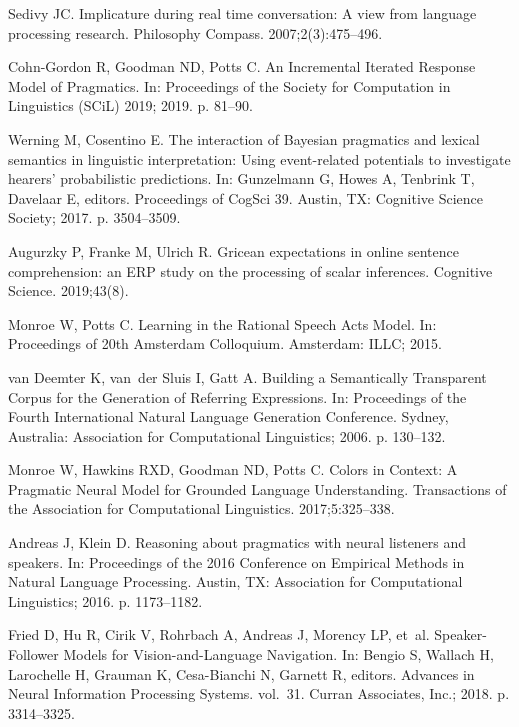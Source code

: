 \documentclass[10pt,letterpaper]{article}
\begin{document}
\begin{thebibliography}{10}
Sedivy JC.
\newblock Implicature during real time conversation: A view from language
  processing research.
\newblock Philosophy Compass. 2007;2(3):475--496.

Cohn-Gordon R, Goodman ND, Potts C.
\newblock An Incremental Iterated Response Model of Pragmatics.
\newblock In: Proceedings of the {S}ociety for {C}omputation in {L}inguistics
  ({SCiL}) 2019; 2019. p. 81--90.

Werning M, Cosentino E.
\newblock The interaction of {B}ayesian pragmatics and lexical semantics in
  linguistic interpretation: {U}sing event-related potentials to investigate
  hearers' probabilistic predictions.
\newblock In: Gunzelmann G, Howes A, Tenbrink T, Davelaar E, editors.
  Proceedings of {CogSci} 39. Austin, TX: Cognitive Science Society; 2017. p.
  3504--3509.

Augurzky P, Franke M, Ulrich R.
\newblock Gricean expectations in online sentence comprehension: an {ERP} study
  on the processing of scalar inferences.
\newblock Cognitive Science. 2019;43(8).

Monroe W, Potts C.
\newblock Learning in the {R}ational {S}peech {A}cts Model.
\newblock In: Proceedings of 20th {A}msterdam {C}olloquium. Amsterdam: ILLC;
  2015.

van Deemter K, van~der Sluis I, Gatt A.
\newblock Building a Semantically Transparent Corpus for the Generation of
  Referring Expressions.
\newblock In: Proceedings of the Fourth International Natural Language
  Generation Conference. Sydney, Australia: Association for Computational
  Linguistics; 2006. p. 130--132.

Monroe W, Hawkins RXD, Goodman ND, Potts C.
\newblock Colors in Context: A Pragmatic Neural Model for Grounded Language
  Understanding.
\newblock Transactions of the Association for Computational Linguistics.
  2017;5:325--338.

Andreas J, Klein D.
\newblock Reasoning about pragmatics with neural listeners and speakers.
\newblock In: Proceedings of the 2016 Conference on Empirical Methods in
  Natural Language Processing. Austin, TX: Association for Computational
  Linguistics; 2016. p. 1173--1182.

Fried D, Hu R, Cirik V, Rohrbach A, Andreas J, Morency LP, et~al.
\newblock Speaker-Follower Models for Vision-and-Language Navigation.
\newblock In: Bengio S, Wallach H, Larochelle H, Grauman K, Cesa-Bianchi N,
  Garnett R, editors. Advances in Neural Information Processing Systems.
  vol.~31. Curran Associates, Inc.; 2018. p. 3314--3325.


\end{thebibliography}
\end{document}
